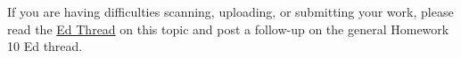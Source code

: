 \documentclass[11pt]{article}
\begin{document}
If you are having difficulties scanning, uploading, or submitting your
work, please read the
\href{https://edstem.org/us/courses/94054/discussion/7533569}{Ed Thread}
on this topic and post a follow-up on the general Homework 10 Ed thread.


    
    
    
\end{document}

